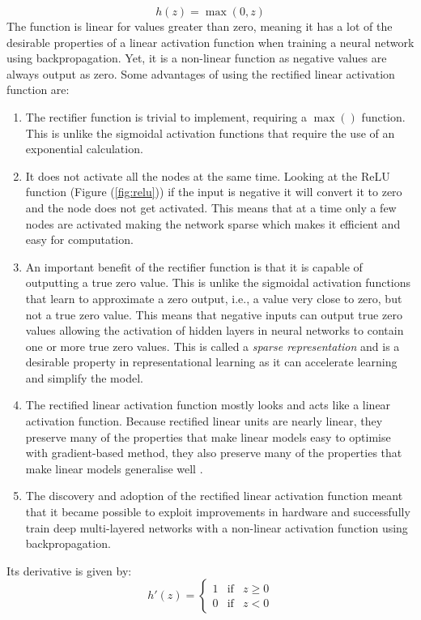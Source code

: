 \documentclass[12pt]{report}
\numberwithin{equation}{section}
\begin{document}
\begin{equation}\label{eqn:relu}
h(z) = \max(0,z)
\end{equation}
The function is linear for values greater than zero, meaning it has a lot of the desirable properties of a linear activation function when training a neural network using backpropagation. Yet, it is a non-linear function as negative values are always output as zero. Some advantages of using the rectified linear activation function are:
\begin{enumerate}[label=(\alph*)]
\item The rectifier function is trivial to implement, requiring a $\max()$ function. This is unlike the sigmoidal activation functions that require the use of an exponential calculation.
\item It does not activate all the nodes at the same time. Looking at the ReLU function (Figure (\ref{fig:relu})) if the input is negative it will convert it to zero and the node does not get activated. This means that at a time only a few nodes are activated making the network sparse which makes it efficient and easy for computation.
\item An important benefit of the rectifier function is that it is capable of outputting a true zero value. This is unlike the sigmoidal activation functions that learn to approximate a zero output, i.e., a value very close to zero, but not a true zero value. This means that negative inputs can output true zero values allowing the activation of hidden layers in neural networks to contain one or more true zero values. This is called a \textit{sparse representation} and is a desirable property in representational learning as it can accelerate learning and simplify the model.
\item The rectified linear activation function mostly looks and acts like a linear activation function. Because rectified linear units are nearly linear, they preserve many of the properties that make linear models easy to optimise with gradient-based method, they also preserve many of the properties that make linear models generalise well \textbf{\cite[p.~175]{10.5555/3086952}}. 
\item The discovery and adoption of the rectified linear activation function meant that it became possible to exploit improvements in hardware and successfully train deep multi-layered networks with a non-linear activation function using backpropagation.
\end{enumerate}
Its derivative is given by:
\begin{equation}\label{eqn:relu_prime}
h'(z) = \left\{\begin{array}{lcr}
		1 & \text{if} & z \geq 0 \\
		0 & \text{if} & z < 0
		\end{array}\right.
\end{equation}
\end{document}
